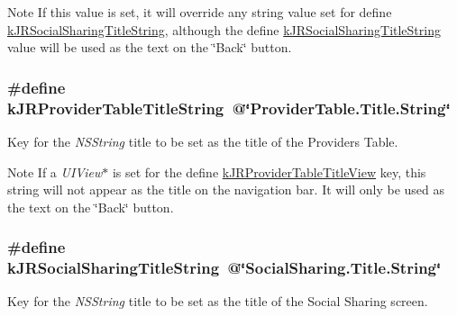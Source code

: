 \begin{DoxyNote}{Note}
If this value is set, it will override any string value set for define \hyperlink{group__custom_interface_ga8fb89469dc5225bf0ea4d1faca6aa2ab}{kJRSocialSharingTitleString}, although the define \hyperlink{group__custom_interface_ga8fb89469dc5225bf0ea4d1faca6aa2ab}{kJRSocialSharingTitleString} value will be used as the text on the \char`\"{}Back\char`\"{} button. 
\end{DoxyNote}
\hypertarget{group__custom_interface_gaf728e45125be9ca6fa515a39a77e7ce7}{
\subsubsection[{kJRProviderTableTitleString}]{\setlength{\rightskip}{0pt plus 5cm}\#define kJRProviderTableTitleString~@\char`\"{}ProviderTable.Title.String\char`\"{}}}
\label{group__custom_interface_gaf728e45125be9ca6fa515a39a77e7ce7}
Key for the {\itshape NSString\/} title to be set as the title of the Providers Table.

\begin{DoxyNote}{Note}
If a {\itshape UIView$\ast$\/} is set for the define \hyperlink{group__custom_interface_ga0bce97edf43c9cdf53cbcd1aa92c4798}{kJRProviderTableTitleView} key, this string will not appear as the title on the navigation bar. It will only be used as the text on the \char`\"{}Back\char`\"{} button. 
\end{DoxyNote}
\hypertarget{group__custom_interface_ga8fb89469dc5225bf0ea4d1faca6aa2ab}{
\subsubsection[{kJRSocialSharingTitleString}]{\setlength{\rightskip}{0pt plus 5cm}\#define kJRSocialSharingTitleString~@\char`\"{}SocialSharing.Title.String\char`\"{}}}
\label{group__custom_interface_ga8fb89469dc5225bf0ea4d1faca6aa2ab}
Key for the {\itshape NSString\/} title to be set as the title of the Social Sharing screen.

